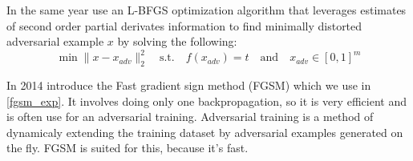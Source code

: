 In the same year \cite{szegedy2014intriguing} use an L-BFGS optimization algorithm that leverages estimates of second order partial derivates information to find minimally distorted adversarial example $x$ by solving the following:
$$\min \lVert x - x_{adv} \rVert_2^2 \quad \text{s.t.} \quad f(x_{adv}) = t \quad \text{and} \quad x_{adv} \in [0, 1]^m$$


In 2014 \cite{goodfellow2015explaining} introduce the Fast gradient sign method (FGSM) which we use in \ref{fgsm_exp}. It involves doing only one backpropagation, so it is very efficient and is often use for an adversarial training. Adversarial training is a method of dynamicaly extending the training dataset by adversarial examples generated on the fly. FGSM is suited for this, because it's fast.
